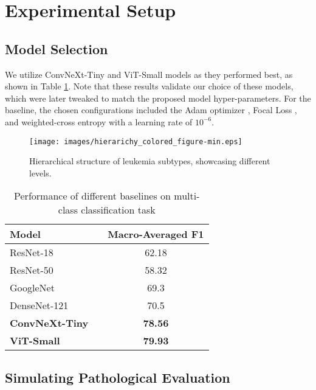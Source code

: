 \documentclass[runningheads]{llncs}
\begin{document}
\section{Experimental Setup}

\subsection{Model Selection}

We utilize ConvNeXt-Tiny and ViT-Small models as they performed best, as shown in Table \ref{tab:baselines}. Note that these results validate our choice of these models, which were later tweaked to match the proposed model hyper-parameters.
 For the baseline, the chosen configurations included the Adam optimizer \cite{kingma2014adam}, Focal Loss \cite{lin2017focal}, and weighted-cross entropy with a learning rate of $10^{-6}$. 


\begin{figure}[t]
  \centering
  \texttt{[image: images/hierarichy\_colored\_figure-min.eps]}  
  \caption{Hierarchical structure of leukemia subtypes, showcasing different levels.}
  \label{fig:hierarchy}
\end{figure}

\begin{table}[!ht]
\centering
\caption{Performance of different baselines on multi-class classification task}
\label{tab:baselines}
\begin{tabular}{@{}llc@{}}
\toprule
\textbf{Model} &  & \textbf{Macro-Averaged F1} \\ \midrule
ResNet-18      &  & 62.18                      \\
ResNet-50      &  & 58.32                      \\
GoogleNet      &  & 69.3                       \\
DenseNet-121   &  & 70.5                       \\
\textbf{ConvNeXt-Tiny}  &  & \textbf{78.56}                      \\
\textbf{ViT-Small}      &  & \textbf{79.93}                      \\ \bottomrule
\end{tabular}
\end{table}


\subsection{Simulating Pathological Evaluation}
\end{document}
